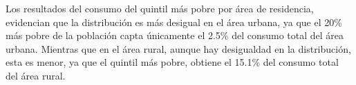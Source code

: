 Los resultados del consumo del quintil más pobre por área de residencia, evidencian que la distribución es más desigual en el área urbana, ya que el 20\% más pobre de la población capta únicamente el 2.5\% del consumo total del área urbana. Mientras que en el área rural, aunque hay desigualdad en la distribución, esta es menor, ya que el quintil más pobre, obtiene el 15.1\% del consumo total del área rural.